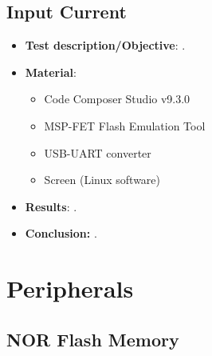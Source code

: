 \subsection{Input Current}

\begin{itemize}
    \item \textbf{Test description/Objective}: .
    \item \textbf{Material}:
        \begin{itemize}
            \item Code Composer Studio v9.3.0
            \item MSP-FET Flash Emulation Tool
            \item USB-UART converter
            \item Screen (Linux software)
        \end{itemize}
    \item \textbf{Results}: .
    \item \textbf{Conclusion:} .
\end{itemize}

%


\section{Peripherals}

\subsection{NOR Flash Memory}

